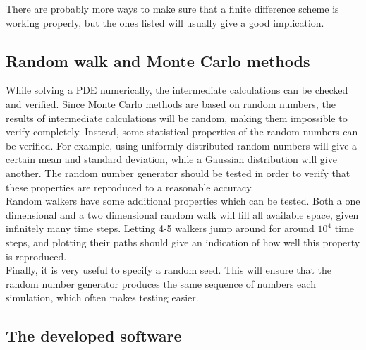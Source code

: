 \noindent There are probably more ways to make sure that a finite difference scheme is working properly, but the ones listed will usually give a good implication.

\subsection{Random walk and Monte Carlo methods}

While solving a PDE numerically, the intermediate calculations can be checked and verified. 
Since Monte Carlo methods are based on random numbers, the results of intermediate calculations will be random, making them impossible to verify completely. 
Instead, some statistical properties of the random numbers can be verified. 
For example, using uniformly distributed random numbers will give a certain mean and standard deviation, while a Gaussian distribution will give another.
The random number generator should be tested in order to verify that these properties are reproduced to a reasonable accuracy. \\

\noindent Random walkers have some additional properties which can be tested. 
Both a one dimensional and a two dimensional random walk will fill all available space, given infinitely many time steps. 
Letting 4-5 walkers jump around for around $10^4$ time steps, and plotting their paths should give an indication of how well this property is reproduced. \\

\noindent Finally, it is very useful to specify a random seed. This will ensure that the random number generator produces the same sequence of numbers each simulation, which often makes testing easier. 
 

\subsection{The developed software}

